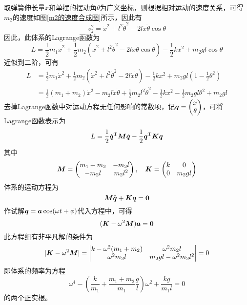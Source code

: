\begin{solution}
取弹簧伸长量$x$和单摆的摆动角$\theta$为广义坐标，则根据相对运动的速度关系，可得$m_2$的速度如图\ref{m2的速度合成图}所示，因此有
\begin{equation*}
	v_2^2 = \dot{x}^2+l^2 \dot{\theta}^2 - 2l\dot{x} \dot{\theta} \cos \theta
\end{equation*}
因此，此体系的Lagrange函数为
\begin{equation*}
	L = \frac12 m_1 \dot{x}^2 + \frac12 m_2 \left(\dot{x}^2+l^2 \dot{\theta}^2 - 2l\dot{x} \dot{\theta} \cos \theta\right) - \frac12 kx^2 + m_2 gl \cos \theta
\end{equation*}
近似到二阶，可有
\begin{align*}
	L & = \frac12 m_1 \dot{x}^2 + \frac12 m_2 \left(\dot{x}^2+l^2 \dot{\theta}^2 - 2l\dot{x} \dot{\theta}\right) - \frac12 kx^2 + m_2 gl \left(1-\frac12 \theta^2\right) \\
	& = \frac12 (m_1+m_2) \dot{x}^2 - m_2l\dot{x} \dot{\theta} + \frac12 m_2l^2 \dot{\theta}^2 - \frac12 kx^2 - \frac12 m_2 gl \theta^2 + m_2 gl
\end{align*}
去掉Lagrange函数中对运动方程无任何影响的常数项，记$\boldsymbol{q} = \begin{pmatrix} x \\ \theta \end{pmatrix}$，可将Lagrange函数表示为
\begin{equation*}
	L = \frac12 \dot{\boldsymbol{q}}^{\mathrm{T}} \boldsymbol{M} \dot{\boldsymbol{q}} - \frac12 \boldsymbol{q}^{\mathrm{T}} \boldsymbol{K} \boldsymbol{q}
\end{equation*}
其中
\begin{equation*}
	\boldsymbol{M} = \begin{pmatrix} m_1+m_2 & -m_2l \\ -m_2l & m_2l^2 \end{pmatrix},\quad \boldsymbol{K} = \begin{pmatrix} k & 0 \\ 0 & m_2gl \end{pmatrix}
\end{equation*}
体系的运动方程为
\begin{equation*}
	\boldsymbol{M} \ddot{\boldsymbol{q}} + \boldsymbol{K} \boldsymbol{q} = \boldsymbol{0}
\end{equation*}
作试解$\boldsymbol{q} = \boldsymbol{a} \cos (\omega t + \phi)$代入方程中，可得
\begin{equation*}
	(\boldsymbol{K} - \omega^2 \boldsymbol{M}) \boldsymbol{a} = \boldsymbol{0}
\end{equation*}
此方程组有非平凡解的条件为
\begin{equation*}
	|\boldsymbol{K} - \omega^2 \boldsymbol{M}| = \begin{vmatrix} k-\omega^2(m_1+m_2) & \omega^2 m_2l \\ \omega^2 m_2l & m_2 gl - \omega^2 m_2l^2 \end{vmatrix} = 0
\end{equation*}
即体系的频率为方程
\begin{equation*}
	\omega^4-\left(\frac{k}{m_1} + \frac{m_1+m_2}{m_1} \frac{g}{l}\right) \omega^2 + \frac{kg}{m_1l} = 0
\end{equation*}
的两个正实根。
\end{solution}

